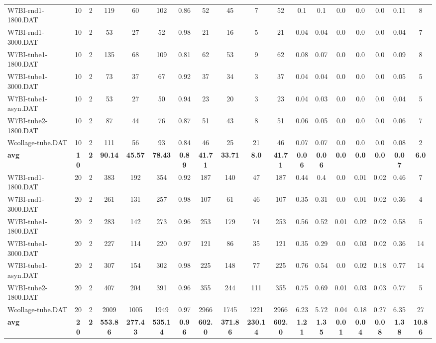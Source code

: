 \begin{sidewaystable}[h]
{\begin{tabular}{lccccccccccccccccc}
W7BI-rnd1-1800.DAT & 10 & 2 & 119 & 60 & 102 & 0.86 & 52 & 45 & 7 & 52 & 0.1 & 0.1 & 0.0 & 0.0 & 0.0 & 0.11 & 8\\
W7BI-rnd1-3000.DAT & 10 & 2 & 53 & 27 & 52 & 0.98 & 21 & 16 & 5 & 21 & 0.04 & 0.04 & 0.0 & 0.0 & 0.0 & 0.04 & 7\\
W7BI-tube1-1800.DAT & 10 & 2 & 135 & 68 & 109 & 0.81 & 62 & 53 & 9 & 62 & 0.08 & 0.07 & 0.0 & 0.0 & 0.0 & 0.09 & 8\\
W7BI-tube1-3000.DAT & 10 & 2 & 73 & 37 & 67 & 0.92 & 37 & 34 & 3 & 37 & 0.04 & 0.04 & 0.0 & 0.0 & 0.0 & 0.05 & 5\\
W7BI-tube1-asyn.DAT & 10 & 2 & 53 & 27 & 50 & 0.94 & 23 & 20 & 3 & 23 & 0.04 & 0.03 & 0.0 & 0.0 & 0.0 & 0.04 & 5\\
W7BI-tube2-1800.DAT & 10 & 2 & 87 & 44 & 76 & 0.87 & 51 & 43 & 8 & 51 & 0.06 & 0.05 & 0.0 & 0.0 & 0.0 & 0.06 & 7\\
Wcollage-tube.DAT & 10 & 2 & 111 & 56 & 93 & 0.84 & 46 & 25 & 21 & 46 & 0.07 & 0.07 & 0.0 & 0.0 & 0.0 & 0.08 & 2\\
\cline{1-18} \textbf{avg} & \textbf{10} & \textbf{2} & \textbf{90.14} & \textbf{45.57} & \textbf{78.43} & \textbf{0.89} & \textbf{41.71} & \textbf{33.71} & \textbf{8.0} & \textbf{41.71} & \textbf{0.06} & \textbf{0.06} & \textbf{0.0} & \textbf{0.0} & \textbf{0.0} & \textbf{0.07} & \textbf{6.0} \\ \cline{1-18}
W7BI-rnd1-1800.DAT & 20 & 2 & 383 & 192 & 354 & 0.92 & 187 & 140 & 47 & 187 & 0.44 & 0.4 & 0.0 & 0.01 & 0.02 & 0.46 & 7\\
W7BI-rnd1-3000.DAT & 20 & 2 & 261 & 131 & 257 & 0.98 & 107 & 61 & 46 & 107 & 0.35 & 0.31 & 0.0 & 0.01 & 0.02 & 0.36 & 4\\
W7BI-tube1-1800.DAT & 20 & 2 & 283 & 142 & 273 & 0.96 & 253 & 179 & 74 & 253 & 0.56 & 0.52 & 0.01 & 0.02 & 0.02 & 0.58 & 5\\
W7BI-tube1-3000.DAT & 20 & 2 & 227 & 114 & 220 & 0.97 & 121 & 86 & 35 & 121 & 0.35 & 0.29 & 0.0 & 0.03 & 0.02 & 0.36 & 14\\
W7BI-tube1-asyn.DAT & 20 & 2 & 307 & 154 & 302 & 0.98 & 225 & 148 & 77 & 225 & 0.76 & 0.54 & 0.0 & 0.02 & 0.18 & 0.77 & 14\\
W7BI-tube2-1800.DAT & 20 & 2 & 407 & 204 & 391 & 0.96 & 355 & 244 & 111 & 355 & 0.75 & 0.69 & 0.01 & 0.03 & 0.03 & 0.77 & 5\\
Wcollage-tube.DAT & 20 & 2 & 2009 & 1005 & 1949 & 0.97 & 2966 & 1745 & 1221 & 2966 & 6.23 & 5.72 & 0.04 & 0.18 & 0.27 & 6.35 & 27\\
\cline{1-18} \textbf{avg} & \textbf{20} & \textbf{2} & \textbf{553.86} & \textbf{277.43} & \textbf{535.14} & \textbf{0.96} & \textbf{602.0} & \textbf{371.86} & \textbf{230.14} & \textbf{602.0} & \textbf{1.21} & \textbf{1.35} & \textbf{0.01} & \textbf{0.04} & \textbf{0.08} & \textbf{1.38} & \textbf{10.86} \\ \cline{1-18}

\end{tabular}}
\end{sidewaystable}

